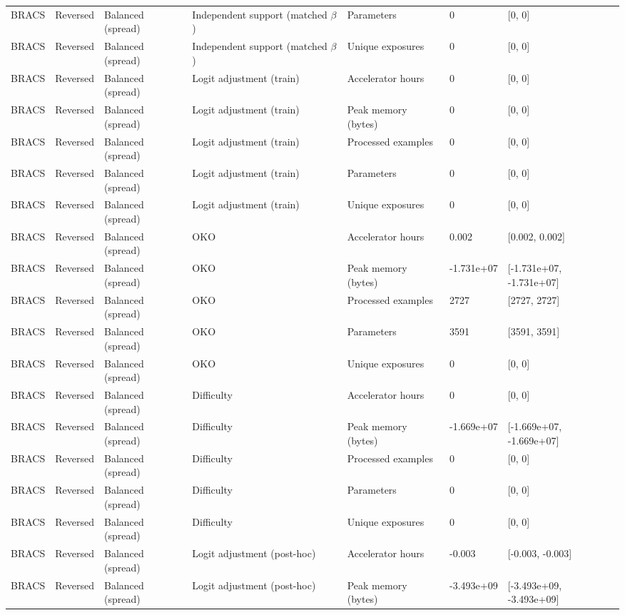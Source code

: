 \begin{longtable}{lllllll}
BRACS & Reversed & Balanced (spread) & Independent support (matched $\beta$) & Parameters & 0 & [0, 0] \\
BRACS & Reversed & Balanced (spread) & Independent support (matched $\beta$) & Unique exposures & 0 & [0, 0] \\
BRACS & Reversed & Balanced (spread) & Logit adjustment (train) & Accelerator hours & 0 & [0, 0] \\
BRACS & Reversed & Balanced (spread) & Logit adjustment (train) & Peak memory (bytes) & 0 & [0, 0] \\
BRACS & Reversed & Balanced (spread) & Logit adjustment (train) & Processed examples & 0 & [0, 0] \\
BRACS & Reversed & Balanced (spread) & Logit adjustment (train) & Parameters & 0 & [0, 0] \\
BRACS & Reversed & Balanced (spread) & Logit adjustment (train) & Unique exposures & 0 & [0, 0] \\
BRACS & Reversed & Balanced (spread) & OKO & Accelerator hours & 0.002 & [0.002, 0.002] \\
BRACS & Reversed & Balanced (spread) & OKO & Peak memory (bytes) & -1.731e+07 & [-1.731e+07, -1.731e+07] \\
BRACS & Reversed & Balanced (spread) & OKO & Processed examples & 2727 & [2727, 2727] \\
BRACS & Reversed & Balanced (spread) & OKO & Parameters & 3591 & [3591, 3591] \\
BRACS & Reversed & Balanced (spread) & OKO & Unique exposures & 0 & [0, 0] \\
BRACS & Reversed & Balanced (spread) & Difficulty & Accelerator hours & 0 & [0, 0] \\
BRACS & Reversed & Balanced (spread) & Difficulty & Peak memory (bytes) & -1.669e+07 & [-1.669e+07, -1.669e+07] \\
BRACS & Reversed & Balanced (spread) & Difficulty & Processed examples & 0 & [0, 0] \\
BRACS & Reversed & Balanced (spread) & Difficulty & Parameters & 0 & [0, 0] \\
BRACS & Reversed & Balanced (spread) & Difficulty & Unique exposures & 0 & [0, 0] \\
BRACS & Reversed & Balanced (spread) & Logit adjustment (post-hoc) & Accelerator hours & -0.003 & [-0.003, -0.003] \\
BRACS & Reversed & Balanced (spread) & Logit adjustment (post-hoc) & Peak memory (bytes) & -3.493e+09 & [-3.493e+09, -3.493e+09] \\

\end{longtable}
